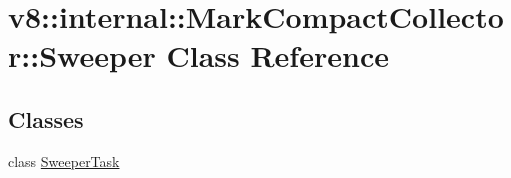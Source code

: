 \hypertarget{classv8_1_1internal_1_1_mark_compact_collector_1_1_sweeper}{}\section{v8\+:\+:internal\+:\+:Mark\+Compact\+Collector\+:\+:Sweeper Class Reference}
\label{classv8_1_1internal_1_1_mark_compact_collector_1_1_sweeper}
\subsection*{Classes}
\begin{DoxyCompactItemize}
\item 
class \hyperlink{classv8_1_1internal_1_1_mark_compact_collector_1_1_sweeper_1_1_sweeper_task}{Sweeper\+Task}
\end{DoxyCompactItemize}
